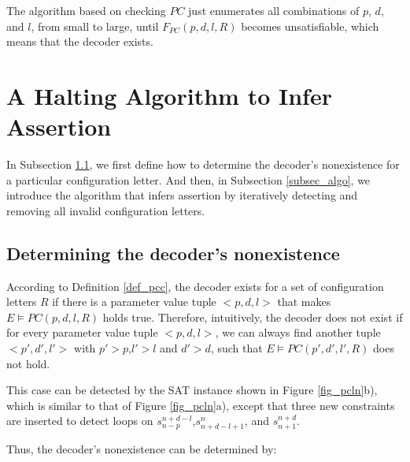 \documentclass[journal]{IEEEtran}
\begin{document}
The algorithm based on checking $PC$\cite{ShengYuShen:iccad09} just enumerates all combinations of $p$, $d$, and $l$,
from small to large,
until $F_{PC}(p,d,l,R)$ becomes unsatisfiable,
which means that the decoder exists.


\section{A Halting Algorithm to Infer Assertion}\label{sec_algo}
In Subsection \ref{subsec_chknonext},
we first define how to determine the decoder's nonexistence for a particular configuration letter.
And then,
in Subsection \ref{subsec_algo},
we introduce the algorithm that infers assertion
by iteratively detecting and removing all invalid configuration letters.

\subsection{Determining the decoder's nonexistence}\label{subsec_chknonext}


According to Definition \ref{def_pcc},
the decoder exists for a set of configuration letters $R$ if there is a parameter value tuple $<p,d,l>$ that makes
$E\vDash PC(p,d,l,R)$ holds true.
Therefore,
intuitively,
the decoder does not exist if for every parameter value tuple $<p,d,l>$,
we can always find another tuple $<p',d',l'>$ with $p'>p$,$l'>l$ and $d'>d$,
such that $E\vDash PC(p',d',l',R)$ does not hold.

This case can be detected by the SAT instance shown in Figure \ref{fig_pcln}b),
which is similar to that of Figure \ref{fig_pcln}a),
except that three new constraints are inserted to detect loops on $s_{n-p}^{n+d-l}$,$s_{n+d-l+1}^n$, and $s_{n+1}^{n+d}$.


Thus,
the decoder's nonexistence can be determined by:
\end{document}
